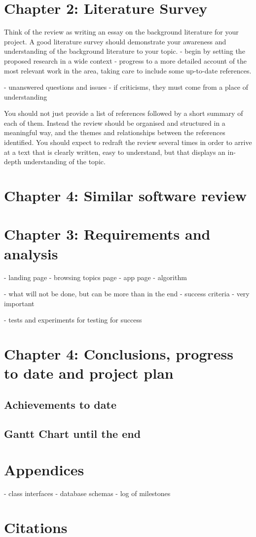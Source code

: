 \documentclass{article}
\begin{document}
\section{Chapter 2: Literature Survey}
Think of the review as writing an essay on the background literature for your project. 
A good literature survey should demonstrate your awareness and understanding of the background literature to your topic. 
- begin by setting the proposed research in a wide context
- progress to a more detailed account of the most relevant work in the area, taking care to include some up-to-date references. 

- unanswered questions and issues
- if criticisms, they must come from a place of understanding

You should not just provide a list of references followed by a short summary of each of them.
Instead the review should be organised and structured in a meaningful way, and the themes and relationships between the references identified. 
You should expect to redraft the review several times in order to arrive at a text that is clearly written, easy to understand, but that displays an in-depth understanding of the topic. 

\section{Chapter 4: Similar software review}


\section{Chapter 3: Requirements and analysis}
- landing page
- browsing topics page
- app page
- algorithm

- what will not be done, but can be more than in the end
- success criteria  - very important

- tests and experiments for testing for success

\section{Chapter 4: Conclusions, progress to date and project plan}

\subsection{Achievements to date}

\subsection{Gantt Chart until the end}

\section{Appendices}
- class interfaces
- database schemas
- log of milestones

\section{Citations}
\newpage
\end{document}
